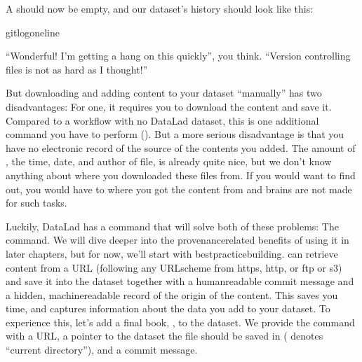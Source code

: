 \sphinxAtStartPar
A  should now be empty, and our dataset’s history should look like this:

\ignorespaces 
\def\sphinxLiteralBlockLabel{\label{\detokenize{basics/101-102-populate:index-12}}}
\begin{sphinxVerbatim}[commandchars=\\\{\}]
gitlog\PYGZhy{}\PYGZhy{}oneline
\end{sphinxVerbatim}

\sphinxAtStartPar
“Wonderful! I’m getting a hang on this quickly”, you think. “Version controlling
files is not as hard as I thought!”

\sphinxAtStartPar
But downloading and adding content to your dataset “manually” has two
disadvantages: For one, it requires you to download the content and save it.
Compared to a workflow with no DataLad dataset, this is one additional command
you have to perform (). But a more
serious disadvantage is that you have no electronic record of the source of the
contents you added. The amount of {\hyperref[\detokenize{glossary:term-provenance}]{}}, the time, date, and author
of file, is already quite nice, but we don’t know anything about where you downloaded
these files from. If you would want to find out, you would have to 
where you got the content from \textendash{} and brains are not made for such tasks.

\sphinxAtStartPar
Luckily, DataLad has a command that will solve both of these problems:
The  command.
We will dive deeper into the provenance\sphinxhyphen{}related benefits of using it in later chapters, but for now,
we’ll start with best\sphinxhyphen{}practice\sphinxhyphen{}building.  can retrieve content
from a URL (following any URL\sphinxhyphen{}scheme from https, http, or ftp or s3) and save it
into the dataset together with a human\sphinxhyphen{}readable commit message and a hidden,
machine\sphinxhyphen{}readable record of the origin of the content. This saves you time,
and captures {\hyperref[\detokenize{glossary:term-provenance}]{}} information about the data you add to your dataset.
To experience this, let’s add a final book,
,
to the dataset. We provide the command with a URL, a pointer to the dataset the
file should be saved in ( denotes “current directory”), and a commit message.


